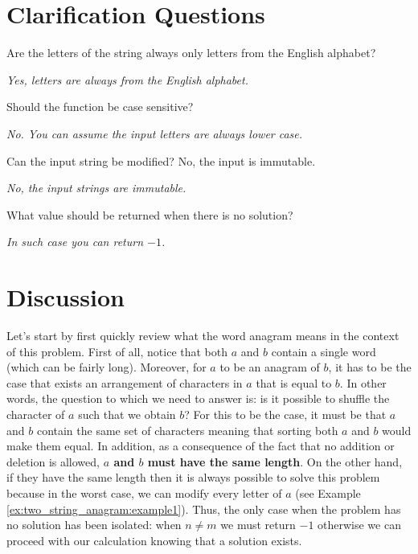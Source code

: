 \section{Clarification Questions}

\begin{QandA}
	\item Are the letters of the string always only letters from the English alphabet?  
	\begin{answered}
		\textit{Yes, letters are always from the English alphabet.}
	\end{answered}
	
	\item Should the function be case sensitive? 
	\begin{answered}
		\textit{ No. You can assume the input letters are always lower case.}
	\end{answered}
	\item Can the input string be modified? No, the input is immutable.
	\begin{answered}
		\textit{No, the input strings are immutable.}
	\end{answered}

	\item What value should be returned when there is no solution?
	\begin{answered}
		\textit{In such case you can return $-1$.}
	\end{answered}
\end{QandA}

\section{Discussion}

Let's start by first quickly review what the word anagram means in the context of this problem. First of all, notice that both $a$ and $b$ contain a single word (which can be fairly long).
Moreover, for $a$ to be an anagram
of $b$, it has to be the case that exists an arrangement of characters in $a$ that is equal to $b$.
In other words, the question to which we need to answer is: is it possible to shuffle the character of $a$ such that we obtain $b$?
For this to be the case, it must be that $a$ and $b$ contain the same set of characters meaning that sorting both $a$ and $b$ would make them equal.
In addition, as a consequence of the fact that no addition or deletion
is allowed, \textbf{$a$ and $b$ must have the same length}. 
On the other hand, if they have the same length then it is always
possible to solve this problem because in the worst case, we can modify every letter of $a$ (see Example \ref{ex:two_string_anagram:example1}).
Thus, the only case when the problem has no solution has been isolated: when $n \neq m$ we must return $-1$ otherwise we can proceed with our calculation knowing that a solution exists.

